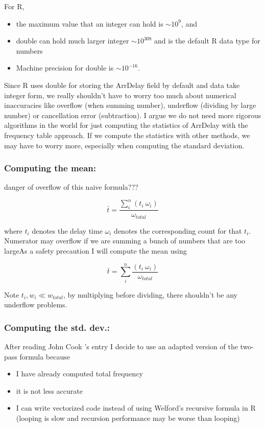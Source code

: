 \documentclass[letterpaper,10pt,english]{/usr/local/lib/python2.7/dist-packages/sphinx/texinputs/sphinxhowto}
\begin{document}
For R,

\begin{itemize}
\itemsep1pt\parskip0pt
\item
  the maximum value that an integer can hold is $\sim 10^9$, and
\item
  double can hold much larger integer $\sim 10^{308}$ and is the default
  R data type for numbers
\item
  Machine precision for double is $\sim 10^{-16}$.
\end{itemize}

Since R uses double for storing the ArrDelay field by default and data
take integer form, we really shouldn't have to worry too much about
numerical inaccuracies like overflow (when summing number), underflow
(dividing by large number) or cancellation error (subtraction). I argue
we do not need more rigorous algorithms in the world for just computing
the statistics of ArrDelay with the frequency table approach. If we
compute the statistics with other methods, we may have to worry more,
especially when computing the standard deviation.\subsubsection{Computing the mean:}danger of overflow of this naive formula???

\[ \bar{t} = \frac{ \sum_i^n (t_i ~\omega_i)}{\omega_{total}}\]

where $t_i$ denotes the delay time $\omega_i$ denotes the corresponding
count for that $t_i$. Numerator may overflow if we are summing a bunch
of numbers that are too largeAs a safety precaution I will compute the mean using

\[ \bar{t} =  \sum_i^n \frac{(t_i ~\omega_i)}{\omega_{total}}\]

Note $t_i, w_i \ll w_{total}$, by multiplying before dividing, there
shouldn't be any underflow problems.\subsubsection{Computing the std. dev.:}After reading John Cook 's entry I decide to use an adapted version of
the two-pass formula because

\begin{itemize}
\itemsep1pt\parskip0pt
\item
  I have already computed total frequency
\item
  it is not less accurate
\item
  I can write vectorized code instead of using Welford's recursive
  formula in R (looping is slow and recursion performance may be worse
  than looping)
\end{itemize}
\end{document}
